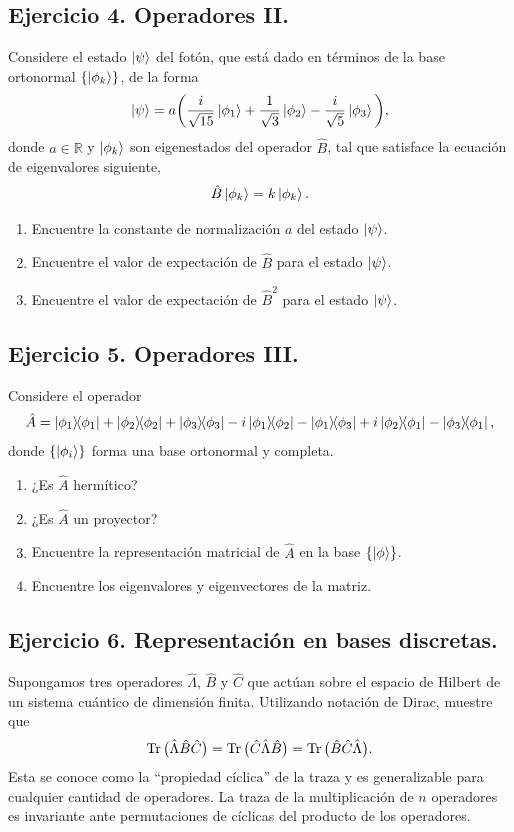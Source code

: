 \documentclass[11pt,letterpaper]{article}
\begin{document}
\subsection*{Ejercicio 4. Operadores II.}
Considere el estado $\ket{\psi}$ del fotón, que está dado en términos de la 
base ortonormal $\qty{\ket{\phi_k}}$, de la forma
\begin{align}
\ket{\psi}=a\bigg(\frac{i}{\sqrt{15}}\ket{\phi_1}+
\frac{1}{\sqrt{3}}\ket{\phi_2}-
\frac{i}{\sqrt{5}}\ket{\phi_3}\bigg),
\end{align}
donde $a\in \mathbb{R}$ y $\ket{\phi_k}$ son eigenestados del 
operador $\hat B$, tal que satisface la ecuación de eigenvalores siguiente,
\begin{align}
\hat B\ket{\phi_k}=k\ket{\phi_k}.
\end{align}
\begin{enumerate}
\item Encuentre la constante de normalización $a$ del estado $\ket{\psi}$. 
\item Encuentre el valor de expectación de $\hat B$ para el estado $\ket{\psi}$.
\item Encuentre el valor de expectación de $\hat B^2$ para el estado 
$\ket{\psi}$. 
\end{enumerate}

\subsection*{Ejercicio 5. Operadores III.}
Considere el operador
\begin{align}
\hat A=\dyad{\phi_1}{\phi_1}+\dyad{\phi_2}{\phi_2}+\dyad{\phi_3}{\phi_3}
-i\dyad{\phi_1}{\phi_2}-\dyad{\phi_1}{\phi_3}+i\dyad{\phi_2}{\phi_1}
-\dyad{\phi_3}{\phi_1},
\end{align}
donde $\qty{\ket{\phi_i}}$ forma una base ortonormal y completa.
\begin{enumerate}
\item ¿Es $\hat A$ hermítico?
\item ¿Es $\hat A$ un proyector?
\item Encuentre la representación matricial de $\hat A$ en la base $\qty{\ket{\phi}}$.
\item Encuentre los eigenvalores y eigenvectores de la matriz. 
\end{enumerate}

\subsection*{Ejercicio 6. Representación en bases discretas.}
Supongamos tres operadores $\hat \Lambda$, $\hat B$ y $\hat C$ que actúan sobre 
el espacio de Hilbert de un sistema cuántico de dimensión finita. Utilizando
notación de Dirac, muestre que
\begin{align}
\Tr \big(\hat \Lambda\hat B\hat C \big)=\Tr \big(\hat C\hat \Lambda\hat B \big)
=\Tr \big(\hat B\hat C\hat \Lambda \big).
\end{align}
Esta se conoce como la ``propiedad cíclica'' de la traza y es generalizable
para cualquier cantidad de operadores. La traza de la multiplicación de $n$
operadores es invariante ante permutaciones de cíclicas del producto de los
operadores.
\end{document}
